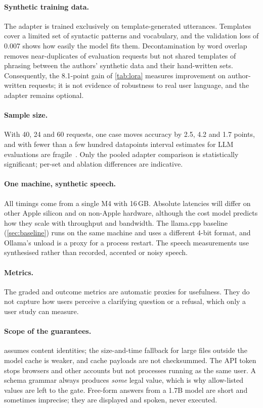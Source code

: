 \documentclass[10pt,twocolumn,letterpaper]{article}
\theoremstyle{definition}
\begin{document}
\paragraph{Synthetic training data.}
The adapter is trained exclusively on template-generated utterances. Templates cover a limited set
of syntactic patterns and vocabulary, and the validation loss of 0.007 shows how easily the model
fits them. Decontamination by word overlap removes near-duplicates of evaluation requests but not
shared templates of phrasing between the authors' synthetic data and their hand-written sets.
Consequently, the 8.1-point gain of \cref{tab:lora} measures improvement on author-written requests;
it is not evidence of robustness to real user language, and the adapter remains optional.

\paragraph{Sample size.}
With 40, 24 and 60 requests, one case moves accuracy by 2.5, 4.2 and 1.7 points, and with fewer
than a few hundred datapoints interval estimates for LLM evaluations are fragile~\cite{bowyer2025clt}.
Only the pooled adapter comparison is statistically significant; per-set and ablation differences
are indicative.

\paragraph{One machine, synthetic speech.}
All timings come from a single M4 with 16\,GB. Absolute latencies will differ on other Apple silicon
and on non-Apple hardware, although the cost model predicts how they scale with throughput and
bandwidth. The llama.cpp baseline (\cref{sec:baseline}) runs on the same machine and uses a
different 4-bit format, and Ollama's unload is a proxy for a process restart. The speech
measurements use synthesised rather than recorded, accented or noisy speech.

\paragraph{Metrics.}
The graded and outcome metrics are automatic proxies for usefulness. They do not capture how users
perceive a clarifying question or a refusal, which only a user study can measure.

\paragraph{Scope of the guarantees.}
 assumes content identities; the size-and-time fallback for large files outside
the model cache is weaker, and cache payloads are not checksummed. The API token stops browsers and
other accounts but not processes running as the same user. A schema grammar always produces
\emph{some} legal value, which is why allow-listed values are left to the gate. Free-form answers
from a 1.7B model are short and sometimes imprecise; they are displayed and spoken, never executed.
\end{document}
